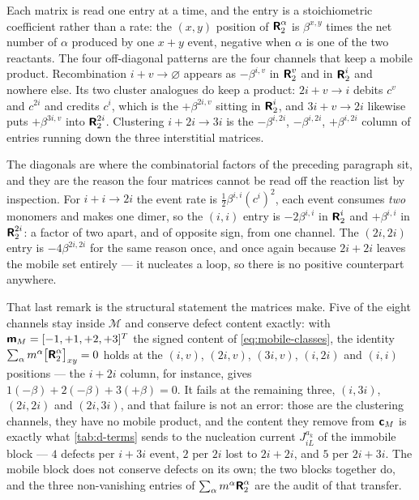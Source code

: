 Each matrix is read one entry at a time, and the entry is a stoichiometric
coefficient rather than a rate: the $(x,y)$ position of $\bm{\mathsf{R}}_2^{\alpha}$ is
$\beta^{x,y}$ times the net number of $\alpha$ produced by one $x\!+\!y$ event,
negative when $\alpha$ is one of the two reactants. The four off-diagonal
patterns are the four channels that keep a mobile product. Recombination
$i\!+\!v\to\varnothing$ appears as $-\beta^{i,v}$ in $\bm{\mathsf{R}}_2^{v}$ and in
$\bm{\mathsf{R}}_2^{i}$ and nowhere else. Its two cluster analogues do keep a product:
$2i\!+\!v\to i$ debits $c^{v}$ and $c^{2i}$ and credits $c^{i}$, which is the
$+\beta^{2i,v}$ sitting in $\bm{\mathsf{R}}_2^{i}$, and $3i\!+\!v\to2i$ likewise puts
$+\beta^{3i,v}$ into $\bm{\mathsf{R}}_2^{2i}$. Clustering $i\!+\!2i\to3i$ is the
$-\beta^{i,2i}$, $-\beta^{i,2i}$, $+\beta^{i,2i}$ column of entries running down
the three interstitial matrices.

The diagonals are where the combinatorial factors of the preceding paragraph
sit, and they are the reason the four matrices cannot be read off the reaction
list by inspection. For $i\!+\!i\to2i$ the event rate is
$\tfrac12\beta^{i,i}(c^{i})^{2}$, each event consumes \emph{two} monomers and
makes one dimer, so the $(i,i)$ entry is $-2\beta^{i,i}$ in $\bm{\mathsf{R}}_2^{i}$ and
$+\beta^{i,i}$ in $\bm{\mathsf{R}}_2^{2i}$: a factor of two apart, and of opposite
sign, from one channel. The $(2i,2i)$ entry is $-4\beta^{2i,2i}$ for the same
reason once, and once again because $2i\!+\!2i$ leaves the mobile set entirely
--- it nucleates a loop, so there is no positive counterpart anywhere.

That last remark is the structural statement the matrices make. Five of the
eight channels stay inside $\mathcal M$ and conserve defect content exactly:
with $\bm{\mathsf{m}}_M=[-1,+1,+2,+3]^{T}$ the signed content of \cref{eq:mobile-classes},
the identity $\sum_{\alpha}m^{\alpha}\bigl[\bm{\mathsf{R}}_2^{\alpha}\bigr]_{xy}=0$
holds at the $(i,v)$, $(2i,v)$, $(3i,v)$, $(i,2i)$ and $(i,i)$ positions --- the
$i\!+\!2i$ column, for instance, gives $1(-\beta)+2(-\beta)+3(+\beta)=0$. It
fails at the remaining three, $(i,3i)$, $(2i,2i)$ and $(2i,3i)$, and that failure
is not an error: those are the clustering channels, they have no mobile product,
and the content they remove from $\bm{\mathsf{c}}_M$ is exactly what \cref{tab:d-terms}
sends to the nucleation current $J^{a_k}_{iL}$ of the immobile block --- $4$
defects per $i\!+\!3i$ event, $2$ per $2i$ lost to $2i\!+\!2i$, and $5$ per
$2i\!+\!3i$. The mobile block does not conserve defects on its own; the two
blocks together do, and the three non-vanishing entries of
$\sum_{\alpha}m^{\alpha}\bm{\mathsf{R}}_2^{\alpha}$ are the audit of that transfer.

